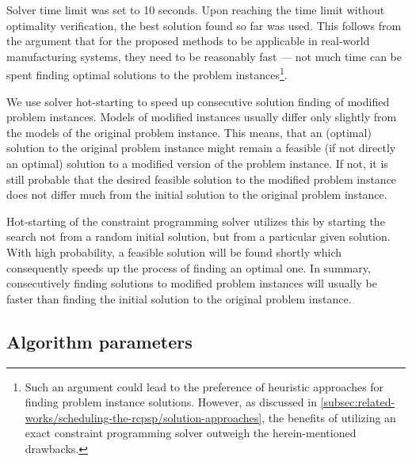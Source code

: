 Solver time limit was set to 10 seconds.
Upon reaching the time limit without optimality verification,
the best solution found so far was used.
This follows from the argument that for the proposed methods
to be applicable in real-world manufacturing systems,
they need to be reasonably fast
--- not much time can be spent finding optimal solutions to the problem instances\footnote{
    Such an argument could lead to the preference of heuristic approaches for finding problem instance solutions.
    However, as discussed in \cref{subsec:related-works/scheduling-the-rcpsp/solution-approaches},
    the benefits of utilizing an exact constraint programming solver outweigh the herein-mentioned drawbacks.
    }.

We use solver hot-starting to speed up consecutive solution finding of modified problem instances.
Models of modified instances usually differ only slightly from the models of the original problem instance.
This means, that an (optimal) solution to the original problem instance
might remain a feasible (if not directly an optimal) solution to a modified version of the problem instance.
If not, it is still probable that the desired feasible solution to the modified problem instance
does not differ much from the initial solution to the original problem instance.

Hot-starting of the constraint programming solver utilizes this
by starting the search not from a random initial solution, but from a particular given solution.
With high probability, a feasible solution will be found shortly
which consequently speeds up the process of finding an optimal one.
In summary, consecutively finding solutions to modified problem instances will usually be faster
than finding the initial solution to the original problem instance.

\subsection{Algorithm parameters} \label{subsec:numerical-experiments/setup/algorithm-parameters}


